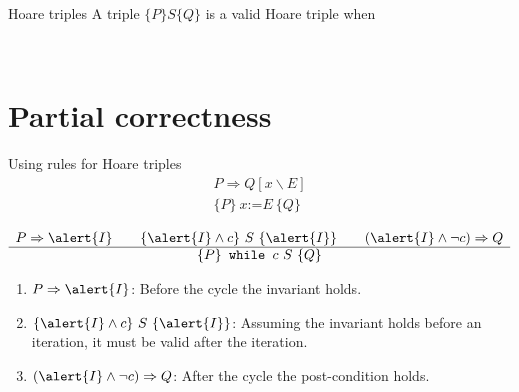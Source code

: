 \documentclass[aspectratio=169]{beamer}
\begin{document}
\begin{frame}{Hoare triples}
  A triple $\{P\} S \{Q\}$ is a valid Hoare triple when

  ~\\[5mm]


\end{frame}


\section{Partial correctness}


\begin{frame}{Using rules for Hoare triples}
  $$\begin{array}{c}
    P \Rightarrow Q[x\backslash E]
    \\\hline
    \{P\}~x\texttt{:=}E~\{Q\}
    \end{array}$$

  $$\begin{array}{c}
    P\Rightarrow \alert{I} \qquad \{\alert{I}\land c\} ~S~ \{\alert{I}\} \qquad (\alert{I} \land \lnot c)\Rightarrow Q
    \\\hline
    \{P\} \texttt{ while }c~S~\{Q\}
    \end{array}$$

    \begin{enumerate}
      \item $P \Rightarrow \alert{I}$: Before the cycle the invariant holds.
      \item $\{\alert{I} \land c\}~S~\{ \alert{I} \}$: Assuming the invariant holds before an iteration, it must be valid after the iteration.
      \item $(\alert{I} \land \lnot c) \Rightarrow Q$: After the cycle the post-condition holds.
    \end{enumerate}
\end{frame}
\end{document}
